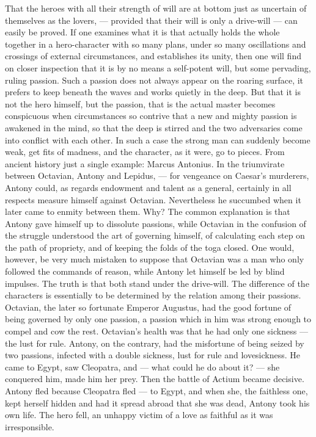 \documentclass[12pt,a4paper,openany]{book}
\newcommand{\opage}[1]{\marginnote{\footnotesize\textit{[#1]}}}
\begin{document}
That the heroes with all their strength of will are at bottom
just as uncertain of themselves as the lovers, --- provided that
their will is only a drive-will --- can easily be proved. If one examines
what it is that actually holds the whole together in a hero-character
with so many plans, under so many oscillations and
crossings of external circumstances, and establishes its unity,
then one will find on closer inspection
that it is by no means a self-potent will, but some
pervading, ruling passion. Such a
passion does not always appear on the roaring
surface, it prefers to keep beneath the waves and works
quietly in the deep. But that it is not the hero himself, but the passion,
that is the actual master becomes conspicuous
when circumstances so contrive that a
new and mighty passion is awakened in the mind, so that the deep is stirred and the
two adversaries come into conflict with each other. In such
a case the strong man can suddenly become weak, get
fits of madness, and the character, as it were, go to pieces.
From ancient history just a single example: Marcus
\setcounter{footnote}{0}%
\opage{21}Antonius. In the triumvirate between Octavian, Antony and
Lepidus, --- for vengeance on Caesar's murderers, Antony could,
as regards endowment and talent as a general, certainly in all
respects measure himself against Octavian. Nevertheless he succumbed
when it later came to enmity between them.
Why? The common explanation is that Antony gave
himself up to dissolute passions, while Octavian
in the confusion of the struggle understood the art of governing
himself, of calculating each step on the path of propriety, and of keeping
the folds of the toga closed. One would, however, be very much
mistaken to suppose that Octavian was a man who only
followed the commands of reason, while Antony let himself be led by
blind impulses. The truth is that both stand under the
drive-will. The difference of the characters is essentially to be determined
by the relation among their passions. Octavian, the
later so fortunate Emperor Augustus, had the good fortune of being
governed by only one passion, a passion which in
him was strong enough to compel and cow the rest. Octavian's
health was that he had only one sickness --- the lust for rule.
Antony, on the contrary, had the misfortune of being seized
by two passions, infected with a double sickness, lust for rule
and lovesickness. He came to Egypt, saw Cleopatra, and
--- what could he do about it? --- she conquered him, made
him her prey. Then the battle of Actium became decisive.
Antony fled because Cleopatra fled --- to Egypt,
and when she, the faithless one, kept herself hidden and had it spread
abroad that she was dead, Antony took his own life.
The hero fell, an unhappy victim of a love as faithful as
it was irresponsible.
\end{document}
